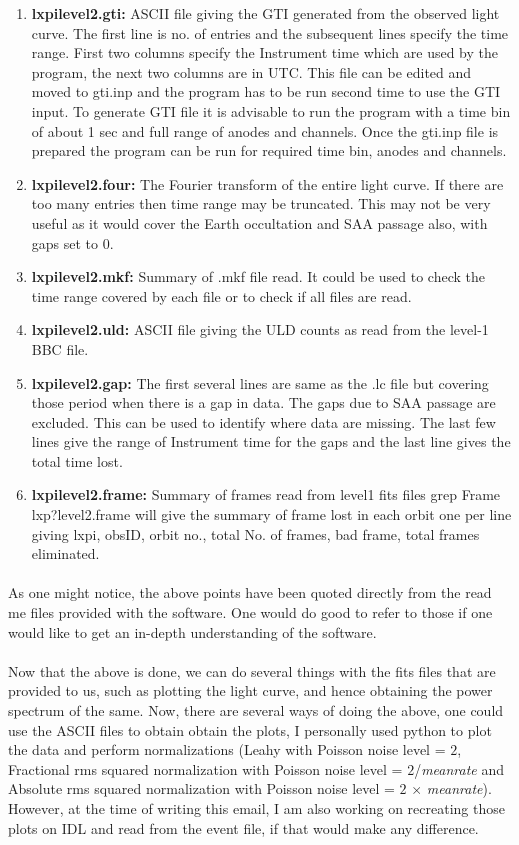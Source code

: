 \documentclass[a4paper,twoside]{report}
\numberwithin{equation}{section}
\begin{document}
\begin{enumerate}
\item \textbf{lxpilevel2.gti:} ASCII file giving the GTI generated from the observed light curve.  The first line is no. of entries and the subsequent lines specify the time range. First two columns specify the Instrument time which are used by the program, the next two columns are in UTC. This file can be edited and moved to gti.inp and the program has to be run second time to use the GTI input. To generate GTI file it is advisable to run the program with a time bin of about 1 sec and full range of anodes and channels. Once the gti.inp file is prepared the program can be run for required time bin, anodes and channels.
\item \textbf{lxpilevel2.four:} The Fourier transform of the entire light curve. If there are too many entries then time range  may be truncated. This may not be very useful as it would cover the Earth occultation and SAA passage also, with gaps set to $0$.
\item \textbf{lxpilevel2.mkf:} Summary of .mkf file read. It could be used to check the time range covered by each file or to check if all files are read.
\item \textbf{lxpilevel2.uld:} ASCII file giving the ULD counts as read from the level-1 BBC file.
\item \textbf{lxpilevel2.gap:} The first several lines are same as the .lc file but covering those period when there is a gap in data. The gaps due to SAA passage are excluded. This can be used to identify where data are missing. The last few lines give the range of Instrument time for the gaps and the last line gives the total time lost.
\item \textbf{lxpilevel2.frame:} Summary of frames read from level1 fits files grep Frame lxp?level2.frame will give the summary of frame lost in each orbit one per line giving lxpi, obsID, orbit no., total No. of frames, bad frame, total frames eliminated.
\end{enumerate}
\paragraph{}
As one might notice, the above points have been quoted directly from the read me files provided with the software. One would do good to refer to those if one would like to get an in-depth understanding of the software. 
\paragraph{}
Now that the above is done, we can do several things with the fits files that are provided to us, such as plotting the light curve, and hence obtaining the power spectrum of the same. Now, there are several ways of doing the above, one could use the ASCII files to obtain obtain the plots, I personally used python to plot the data and perform normalizations (Leahy with Poisson noise level = $2$, Fractional rms squared normalization with Poisson noise level = $2$/\textit{meanrate} and  Absolute rms squared normalization with Poisson noise level = $2$ $\times$ \textit{meanrate}). However, at the time of writing this email, I am also working on recreating those plots on IDL and read from the event file, if that would make any difference. 
\end{document}
